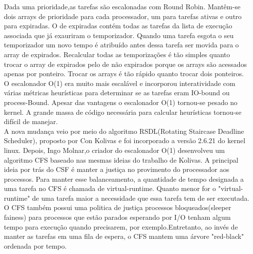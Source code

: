 \documentclass[conference]{IEEEtran}
\begin{document}
 Dada uma prioridade,as tarefas são escalonadas com Round Robin. Mantêm-se dois arrays de prioridade para cada processador, um para tarefas ativas e outro para expiradas. O de expiradas contém todas as tarefas da lista de execução associada que já exauriram o temporizador. Quando uma tarefa esgota o seu temporizador um novo tempo é atribuído antes dessa tarefa ser movida para o array de expirados. Recalcular todas as temporizações é tão simples quanto trocar o array de expirados pelo de não expirados porque os arrays são acessados apenas por ponteiro. Trocar os arrays é tão rápido quanto trocar dois ponteiros\cite{LinuxSchedulerMIT}.\\

 O escalonador O(1) era muito mais escalável e incorporou interatividade com várias métricas heurísticas para determinar se as tarefas eram IO-bound ou process-Bound. Apesar das vantagens o escalonador O(1) tornou-se pesado no kernel. A grande massa de código necessária para calcular heurísticas tornou-se difícil de manejar.\\

 A nova mudança veio por meio do algoritmo RSDL(Rotating Staircase Deadline Scheduler), proposto por Con Kolivas e foi incorporado a versão 2.6.21 do kernel linux. Depois, Ingo Molnar,o criador do escalonador O(1) desenvolveu um algoritmo CFS baseado nas mesmas ideias do trabalho de Kolivas. A principal ideia por trás do CSF é manter a justiça no provimento do processador aos processos. Para manter esse balanceamento, a quantidade de tempo designada a uma tarefa no CFS é chamada de virtual-runtime. Quanto menor for o "virtual-runtime" de uma tarefa maior a necessidade que essa tarefa tem de ser executada.\\
 
O CFS também possui uma politica de justiça processos bloqueados(sleeper fainess) para processos que estão parados esperando por I/O tenham algum tempo para execução quando precisarem, por exemplo.Entretanto, ao invés de manter as tarefas em uma fila de espera, o CFS mantem uma árvore "red-black" ordenada por tempo.\\
\end{document}
